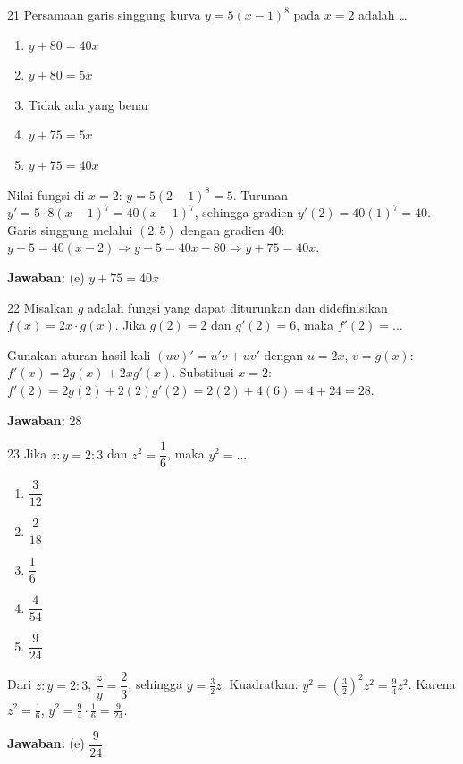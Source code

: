 \documentclass[11pt]{article}
\newenvironment{pil}{\begin{enumerate}[label=(\alph*),leftmargin=*,itemsep=1pt,topsep=3pt]}{\end{enumerate}}
\newcommand{\jw}[1]{\par\smallskip\noindent\textbf{Jawaban:} #1}
\begin{document}
\begin{soalbox}{21}
Persamaan garis singgung kurva $y=5(x-1)^8$ pada $x=2$ adalah \ldots
\begin{pil}\item $y+80=40x$ \item $y+80=5x$ \item Tidak ada yang benar \item $y+75=5x$ \item $y+75=40x$\end{pil}
\end{soalbox}
\begin{pembox}
Nilai fungsi di $x=2$: $y=5(2-1)^8=5$. Turunan $y'=5\cdot8(x-1)^7=40(x-1)^7$, sehingga gradien $y'(2)=40(1)^7=40$. Garis singgung melalui $(2,5)$ dengan gradien 40: $y-5=40(x-2)\Rightarrow y-5=40x-80\Rightarrow y+75=40x$.
\jw{(e) $y+75=40x$}
\end{pembox}

\begin{soalbox}{22}
Misalkan $g$ adalah fungsi yang dapat diturunkan dan didefinisikan $f(x)=2x\cdot g(x)$. Jika $g(2)=2$ dan $g'(2)=6$, maka $f'(2)=\ldots$
\end{soalbox}
\begin{pembox}
Gunakan aturan hasil kali $(uv)'=u'v+uv'$ dengan $u=2x$, $v=g(x)$: $f'(x)=2g(x)+2xg'(x)$. Substitusi $x=2$: $f'(2)=2g(2)+2(2)g'(2)=2(2)+4(6)=4+24=28$.
\jw{28}
\end{pembox}

\begin{soalbox}{23}
Jika $z:y=2:3$ dan $z^2=\dfrac{1}{6}$, maka $y^2=\ldots$
\begin{pil}\item $\dfrac{3}{12}$ \item $\dfrac{2}{18}$ \item $\dfrac{1}{6}$ \item $\dfrac{4}{54}$ \item $\dfrac{9}{24}$\end{pil}
\end{soalbox}
\begin{pembox}
Dari $z:y=2:3$, $\dfrac{z}{y}=\dfrac{2}{3}$, sehingga $y=\tfrac{3}{2}z$. Kuadratkan: $y^2=\left(\tfrac{3}{2}\right)^2 z^2=\tfrac{9}{4}z^2$. Karena $z^2=\tfrac{1}{6}$, $y^2=\tfrac{9}{4}\cdot\tfrac{1}{6}=\tfrac{9}{24}$.
\jw{(e) $\dfrac{9}{24}$}
\end{pembox}
\end{document}

